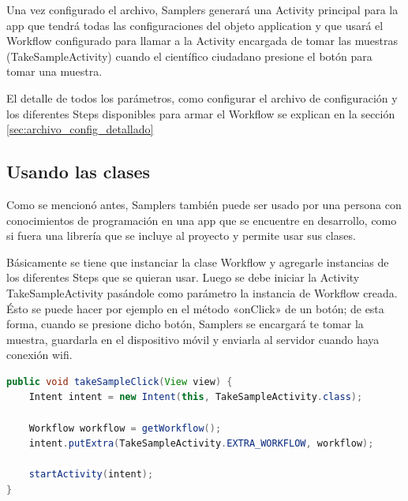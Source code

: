 Una vez configurado el archivo, Samplers generará una Activity principal para la app que tendrá todas las configuraciones del objeto application y que usará el Workflow configurado para llamar a la Activity encargada de tomar las muestras (TakeSampleActivity) cuando el científico ciudadano presione el botón para tomar una muestra.

El detalle de todos los parámetros, como configurar el archivo de configuración y los diferentes Steps disponibles para armar el Workflow se explican en la sección \ref{sec:archivo_config_detallado}


\subsection{Usando las clases} \label{sec:usando_las_clases}
Como se mencionó antes, Samplers también puede ser usado por una persona con conocimientos de programación en una app que se encuentre en desarrollo, como si fuera una librería que se incluye al proyecto y permite usar sus clases. 

Básicamente se tiene que instanciar la clase Workflow y agregarle instancias de los diferentes Steps que se quieran usar. Luego se debe  iniciar la Activity TakeSampleActivity pasándole como parámetro la instancia de Workflow creada. Ésto se puede hacer por ejemplo en el método «onClick» de un botón; de esta forma, cuando se presione dicho botón, Samplers se encargará te tomar la muestra, guardarla en el dispositivo móvil y enviarla al servidor cuando haya conexión wifi.

\begin{lstlisting}[language=Java, frame=tlbr, caption=Ejemplo de como iniciar la activity TakeSampleActivity instanciando las clases.]
public void takeSampleClick(View view) {
	Intent intent = new Intent(this, TakeSampleActivity.class);  
	
	Workflow workflow = getWorkflow();       
	intent.putExtra(TakeSampleActivity.EXTRA_WORKFLOW, workflow);
	
	startActivity(intent);
}		
\end{lstlisting}

